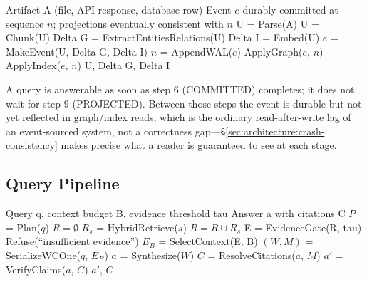 \begin{algorithm}[H]
\caption{Ingestion Pipeline (event-sourced)}
\label{alg:ingestion}
\begin{algorithmic}[1]
\Require Artifact A (file, API response, database row)
\Ensure Event $e$ durably committed at sequence $n$; projections eventually consistent with $n$
\State U = Parse(A) 
\State U = Chunk(U) 
\State Delta G = ExtractEntitiesRelations(U) 
\State Delta I = Embed(U) 
\State $e$ = MakeEvent(U, Delta G, Delta I) 
\State $n$ = AppendWAL($e$) 
\State ApplyGraph($e$, $n$) 
\State ApplyIndex($e$, $n$) 
\State \Return U, Delta G, Delta I 
\end{algorithmic}
\end{algorithm}

A query is answerable as soon as step 6 (COMMITTED) completes; it does not wait for step 9 (PROJECTED). Between those steps the event is durable but not yet reflected in graph/index reads, which is the ordinary read-after-write lag of an event-sourced system, not a correctness gap---\S\ref{sec:architecture:crash-consistency} makes precise what a reader is guaranteed to see at each stage.

\subsection{Query Pipeline}
\label{sec:arch:query-pipeline}

\begin{algorithm}[H]
\caption{Query Execution Pipeline}
\label{alg:query}
\begin{algorithmic}[1]
\Require Query q, context budget B, evidence threshold tau
\Ensure Answer a with citations C
\State $P$ = Plan($q$) 
\State $R = \emptyset$
  \State $R_s$ = HybridRetrieve($s$) 
  \State $R = R \cup R_s$
\EndFor
\State E = EvidenceGate(R, tau) 
  \State \Return Refuse(``insufficient evidence'')
\EndIf
\State $E_B$ = SelectContext(E, B) 
\State $(W, M)$ = SerializeWCOne($q$, $E_B$) 
\State $a$ = Synthesize($W$) 
\State $C$ = ResolveCitations($a$, $M$) 
\State $a'$ = VerifyClaims($a$, $C$) 
\State \Return $a'$, $C$
\end{algorithmic}
\end{algorithm}

